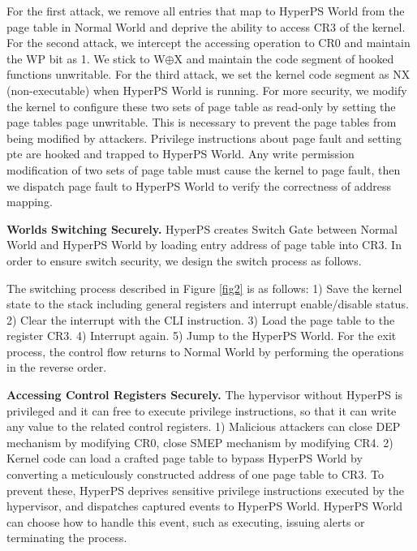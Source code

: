 \documentclass[conference]{IEEEtran}
\begin{document}
For the first attack, %
we remove all entries that map to HyperPS World from the page table in Normal World and deprive the ability to access CR3 of the kernel. %
For the second attack, we intercept the accessing operation to CR0 and maintain the WP bit as 1. We stick to W$\oplus${X} and maintain the code segment of hooked functions unwritable.
For the third attack, we set the kernel code segment as NX (non-executable) when HyperPS World is running. For more security, we modify the kernel to configure these two sets of page table as read-only by setting the page tables page unwritable. This is necessary to prevent the page tables from being modified by attackers. Privilege instructions about page fault and setting pte are hooked and trapped to HyperPS World. Any write permission modification of two sets of page table must cause the kernel to page fault, then we dispatch page fault to HyperPS World to verify the correctness of address mapping. 


\textbf{Worlds Switching Securely.}
HyperPS creates Switch Gate between Normal World and HyperPS World by loading entry address of page table into CR3.
In order to ensure switch security, we design the switch process as follows.

The switching process described in Figure \ref{fig2} is as follows: 1) Save the kernel state to the stack including general registers and interrupt enable/disable status. 2) Clear the interrupt with the CLI instruction. 3) Load the page table to the register CR3. 4) Interrupt again. 5) Jump to the HyperPS World. For the exit process, the control flow returns to Normal World by performing the operations in the reverse order.


\textbf{Accessing Control Registers Securely.}
The hypervisor without HyperPS is privileged and it can free to execute privilege instructions, so that it can write any value to the related control registers. 1) Malicious attackers can close DEP mechanism by modifying CR0, close SMEP mechanism by modifying CR4. 2) Kernel code can load a crafted page table to bypass HyperPS World by converting a meticulously constructed address of one page table to CR3.
To prevent these, HyperPS deprives sensitive privilege instructions executed by the hypervisor, and dispatches captured events to HyperPS World. HyperPS World can choose how to handle this event, such as executing, issuing alerts or terminating the process. 
\end{document}
